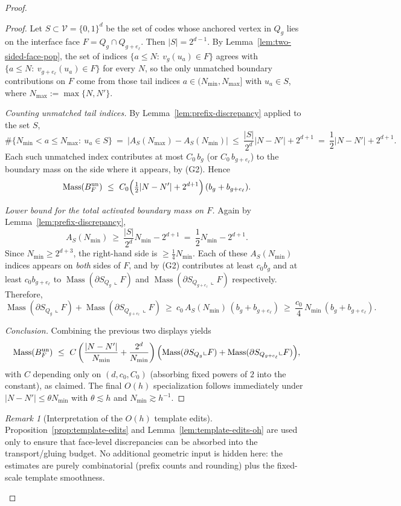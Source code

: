 \documentclass[11pt]{article}
\numberwithin{equation}{section}  %
\theoremstyle{plain}
\theoremstyle{definition}
\theoremstyle{remark}
\newtheorem{remark}[theorem]{Remark}
\DeclareMathOperator{\Mass}{Mass}
\begin{document}
\begin{proof}
\begin{proof}
Let $S\subset\mathcal V=\{0,1\}^d$ be the set of codes whose anchored vertex in $Q_g$ lies on the interface face
$F=Q_g\cap Q_{g+e_\ell}$.  Then $|S|=2^{d-1}$.
By Lemma~\ref{lem:two-sided-face-pop}, the set of indices $\{a\le N:\ v_g(u_a)\in F\}$ agrees with
$\{a\le N:\ v_{g+e_\ell}(u_a)\in F\}$ for every $N$, so the only unmatched boundary contributions on $F$ come from those
tail indices $a\in(N_{\min},N_{\max}]$ with $u_a\in S$, where $N_{\max}:=\max\{N,N'\}$.

\smallskip\noindent\emph{Counting unmatched tail indices.}
By Lemma~\ref{lem:prefix-discrepancy} applied to the set $S$,
\[
\#\{N_{\min}<a\le N_{\max}:\ u_a\in S\}
\ =\ |A_S(N_{\max})-A_S(N_{\min})|
\ \le\ \frac{|S|}{2^d}|N-N'|+2^{d+1}
\ =\ \frac12|N-N'|+2^{d+1}.
\]
Each such unmatched index contributes at most $C_0\,b_g$ (or $C_0\,b_{g+e_\ell}$) to the boundary mass on the side where it appears,
by (G2).  Hence
\[
\Mass(B_F^{\mathrm{un}})
\ \le\ C_0\Bigl(\tfrac12|N-N'|+2^{d+1}\Bigr)\,(b_g+b_{g+e_\ell}).
\]

\smallskip\noindent\emph{Lower bound for the total activated boundary mass on $F$.}
Again by Lemma~\ref{lem:prefix-discrepancy},
\[
A_S(N_{\min})\ \ge\ \frac{|S|}{2^d}N_{\min}-2^{d+1}\ =\ \frac12 N_{\min}-2^{d+1}.
\]
Since $N_{\min}\ge 2^{d+3}$, the right-hand side is $\ge \frac14 N_{\min}$.
Each of these $A_S(N_{\min})$ indices appears on \emph{both} sides of $F$, and by (G2) contributes at least $c_0 b_g$ and
at least $c_0 b_{g+e_\ell}$ to $\Mass(\partial S_{Q_g}\llcorner F)$ and $\Mass(\partial S_{Q_{g+e_\ell}}\llcorner F)$ respectively.
Therefore,
\[
\Mass(\partial S_{Q_g}\llcorner F)+\Mass(\partial S_{Q_{g+e_\ell}}\llcorner F)
\ \ge\ c_0\,A_S(N_{\min})\,(b_g+b_{g+e_\ell})
\ \ge\ \frac{c_0}{4}\,N_{\min}\,(b_g+b_{g+e_\ell}).
\]

\smallskip\noindent\emph{Conclusion.}
Combining the previous two displays yields
\[
\Mass(B_F^{\mathrm{un}})
\ \le\ C\left(\frac{|N-N'|}{N_{\min}}+\frac{2^d}{N_{\min}}\right)
\Bigl(\Mass(\partial S_{Q_g}\llcorner F)+\Mass(\partial S_{Q_{g+e_\ell}}\llcorner F)\Bigr),
\]
with $C$ depending only on $(d,c_0,C_0)$ (absorbing fixed powers of $2$ into the constant), as claimed.
The final $O(h)$ specialization follows immediately under $|N-N'|\le \theta N_{\min}$ with $\theta\lesssim h$ and $N_{\min}\gtrsim h^{-1}$.
\end{proof}

\begin{remark}[Interpretation of the $O(h)$ template edits]\label{rem:template-edits-remark}
Proposition~\ref{prop:template-edits} and Lemma~\ref{lem:template-edits-oh} are used only to ensure that face-level discrepancies can be absorbed into the transport/gluing budget. No additional geometric input is hidden here: the estimates are purely combinatorial (prefix counts and rounding) plus the fixed-scale template smoothness.
\end{remark}






\end{proof}
\end{document}
